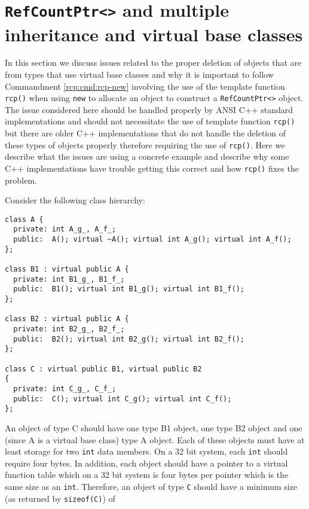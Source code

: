 %
\section{\texttt{RefCountPtr<>} and multiple inheritance and virtual base classes}
\label{rcp:apdx:mivbc}
%

In this section we discuss issues related to the proper deletion of
objects that are from types that use virtual base classes and why it
is important to follow Commandment \ref{rcp:cmd:rcp-new} involving the
use of the template function {}\texttt{rcp()} when using
{}\texttt{new} to allocate an object to construct a
{}\texttt{RefCountPtr<>} object.  The issue considered here should be
handled properly by ANSI C++ standard implementations and should not
necessitate the use of template function {}\texttt{rcp()} but there
are older C++ implementations that do not handle the deletion of these
types of objects properly therefore requiring the use of
{}\texttt{rcp()}.  Here we describe what the issues are using a
concrete example and describe why some C++ implementations have
trouble getting this correct and how {}\texttt{rcp()} fixes the
problem.

Consider the following class hierarchy:

{\small\begin{verbatim}
class A {
  private: int A_g_, A_f_;
  public:  A(); virtual ~A(); virtual int A_g(); virtual int A_f();
};

class B1 : virtual public A {
  private: int B1_g_, B1_f_;
  public:  B1(); virtual int B1_g(); virtual int B1_f();
};

class B2 : virtual public A {
  private: int B2_g_, B2_f_;
  public:  B2(); virtual int B2_g(); virtual int B2_f();
};

class C : virtual public B1, virtual public B2
{
  private: int C_g_, C_f_;
  public:  C(); virtual int C_g(); virtual int C_f();
};
\end{verbatim}}

An object of type C should have one type B1 object, one type B2 object
and one (since A is a virtual base class) type A object.  Each of
these objects must have at least storage for two {}\texttt{int} data
members.  On a 32 bit system, each {}\texttt{int} should require four
bytes.  In addition, each object should have a pointer to a virtual
function table which on a 32 bit system is four bytes per pointer
which is the same size as an {}\texttt{int}.  Therefore, an object of
type {}\texttt{C} should have a minimum size (as returned by
{}\texttt{sizeof(C)}) of

